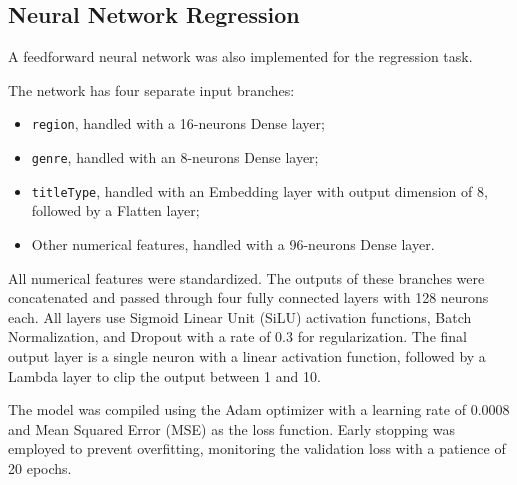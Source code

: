 
\subsection{Neural Network Regression}
A feedforward neural network was also implemented for the regression task.

The network has four separate input branches:
\begin{itemize}
    \item \texttt{region}, handled with a 16-neurons Dense layer;
    \item \texttt{genre}, handled with an 8-neurons Dense layer;
    \item \texttt{titleType}, handled with an Embedding layer
    with output dimension of 8, followed by a Flatten layer;
    \item Other numerical features, handled with a 96-neurons
    Dense layer.
\end{itemize}
All numerical features were standardized.
The outputs of these branches were concatenated and passed through
four fully connected layers with 128 neurons each. All layers use
Sigmoid Linear Unit (SiLU) activation functions, Batch Normalization,
and Dropout with a rate of 0.3 for regularization.
The final output layer is a single neuron with a linear activation
function, followed by a Lambda layer to clip the output between 1 and
10.

The model was compiled using the Adam optimizer with a learning rate
of 0.0008 and Mean Squared Error (MSE) as the loss function.
Early stopping was employed to prevent overfitting, monitoring the
validation loss with a patience of 20 epochs.


